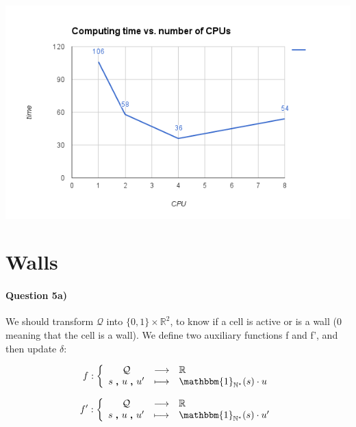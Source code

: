 \documentclass[a4paper,12pt]{article}
\begin{document}
\begin{center}
  \includegraphics[scale=0.8]{results/perfs.png}
\end{center}


\section{Walls}

\paragraph{Question 5a)} We should transform $\mathcal{Q}$ into $\{0, 1\} \times \mathbb{R}^2$, to know if a cell is active or is a wall (0 meaning that the cell is a wall). We define two auxiliary functions f and f', and then update $\delta$: 


\begin{eqnarray*}
f : \left \{ \begin{array}{c c l }
  \mathcal{Q} & \longrightarrow & \mathbb{R} \\
  s \ \pmb{,} \ u\ \pmb{,} \ u' & \longmapsto & \mathbbm{1}_{\mathbb{N}^*}(s) \cdot u
  \end{array} \right .
\end{eqnarray*}


\begin{eqnarray*}
f' : \left \{ \begin{array}{c c l }
  \mathcal{Q} & \longrightarrow & \mathbb{R} \\
  s \ \pmb{,} \ u\ \pmb{,} \ u' & \longmapsto & \mathbbm{1}_{\mathbb{N}^*}(s) \cdot u'
  \end{array} \right .
\end{eqnarray*}
\end{document}
